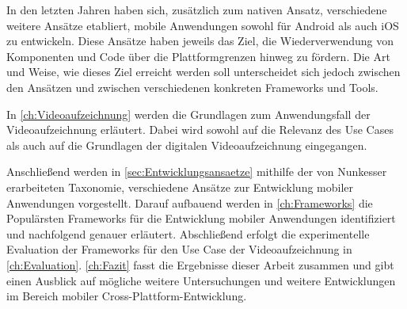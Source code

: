 In den letzten Jahren haben sich, zusätzlich zum nativen Ansatz, verschiedene weitere Ansätze etabliert, mobile Anwendungen sowohl für Android als auch iOS zu entwickeln.
Diese Ansätze haben jeweils das Ziel, die Wiederverwendung von Komponenten und Code über die Plattformgrenzen hinweg zu fördern.
Die Art und Weise, wie dieses Ziel erreicht werden soll unterscheidet sich jedoch zwischen den Ansätzen und zwischen verschiedenen konkreten Frameworks und Tools.

In \autoref{ch:Videoaufzeichnung} werden die Grundlagen zum Anwendungsfall der Videoaufzeichnung erläutert.
Dabei wird sowohl auf die Relevanz des Use Cases als auch auf die Grundlagen der digitalen Videoaufzeichnung eingegangen.




Anschließend werden in \autoref{sec:Entwicklungsansaetze} mithilfe der von Nunkesser \cite{Nunkesser_Taxonomy_Apps} erarbeiteten Taxonomie, verschiedene Ansätze zur Entwicklung mobiler Anwendungen vorgestellt.
Darauf aufbauend werden in \autoref{ch:Frameworks} die Populärsten Frameworks für die Entwicklung mobiler Anwendungen identifiziert und nachfolgend genauer erläutert.
Abschließend erfolgt die experimentelle Evaluation der Frameworks für den Use Case der Videoaufzeichnung in \autoref{ch:Evaluation}.
\autoref{ch:Fazit} fasst die Ergebnisse dieser Arbeit zusammen und gibt einen Ausblick auf mögliche weitere Untersuchungen und weitere Entwicklungen im Bereich mobiler Cross-Plattform-Entwicklung.
